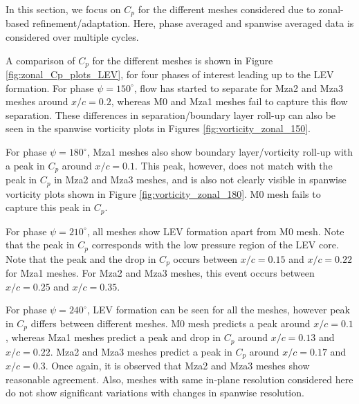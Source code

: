 
In this section, we focus on $C_p$ for the different meshes considered due to zonal-based refinement/adaptation. Here, phase averaged and spanwise averaged data is considered over multiple cycles.

A comparison of $C_p$ for the different meshes is shown in Figure \ref{fig:zonal_Cp_plots_LEV}, for four phases of interest leading up to the LEV formation. For phase $\psi=150^\circ$, flow has started to separate for Mza2 and Mza3 meshes around $x/c = 0.2$, whereas M0 and Mza1 meshes fail to capture this flow separation. These differences in separation/boundary layer roll-up can also be seen in the spanwise vorticity plots in Figures \ref{fig:vorticity_zonal_150}.

For phase $\psi=180^\circ$, Mza1 meshes also show boundary layer/vorticity roll-up with a peak in $C_p$ around $x/c = 0.1$. This peak, however, does not match with the peak in $C_p$ in Mza2 and Mza3 meshes, and is also not clearly visible in spanwise vorticity plots shown in Figure \ref{fig:vorticity_zonal_180}. M0 mesh fails to capture this peak in $C_p$. 


For phase $\psi=210^\circ$, all meshes show LEV formation apart from M0 mesh. Note that the peak in $C_p$ corresponds with the low pressure region of the LEV core. Note that the peak and the drop in $C_p$ occurs between $x/c=0.15$ and $x/c=0.22$ for Mza1 meshes. For Mza2 and Mza3 meshes, this event occurs between $x/c=0.25$ and $x/c=0.35$.

For phase $\psi=240^\circ$, LEV formation can be seen for all the meshes, however peak in $C_p$ differs between different meshes. M0 mesh predicts a peak around $x/c=0.1$, whereas Mza1 meshes predict a peak and drop in $C_p$ around $x/c=0.13$ and $x/c=0.22$. Mza2 and Mza3 meshes predict a peak in $C_p$ around $x/c=0.17$ and $x/c=0.3$. Once again, it is observed that Mza2 and Mza3 meshes show reasonable agreement. Also, meshes with same in-plane resolution considered here do not show significant variations with changes in spanwise resolution.




